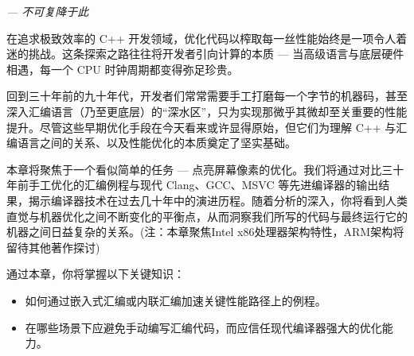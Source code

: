 \begin{flushright}
\textit{--- 不可复降于此}
\end{flushright}

在追求极致效率的 C++ 开发领域，优化代码以榨取每一丝性能始终是一项令人着迷的挑战。这条探索之路往往将开发者引向计算的本质 --- 当高级语言与底层硬件相遇，每一个 CPU 时钟周期都变得弥足珍贵。

回到三十年前的九十年代，开发者们常常需要手工打磨每一个字节的机器码，甚至深入汇编语言（乃至更底层）的“深水区”，只为实现那微乎其微却至关重要的性能提升。尽管这些早期优化手段在今天看来或许显得原始，但它们为理解 C++ 与汇编语言之间的关系、以及性能优化的本质奠定了坚实基础。

本章将聚焦于一个看似简单的任务 --- 点亮屏幕像素的优化。我们将通过对比三十年前手工优化的汇编例程与现代 Clang、GCC、MSVC 等先进编译器的输出结果，揭示编译器技术在过去几十年中的演进历程。随着分析的深入，你将看到人类直觉与机器优化之间不断变化的平衡点，从而洞察我们所写的代码与最终运行它的机器之间日益复杂的关系。(注：本章聚焦Intel x86处理器架构特性，ARM架构将留待其他著作探讨)

通过本章，你将掌握以下关键知识：

\begin{itemize}
\item 
如何通过嵌入式汇编或内联汇编加速关键性能路径上的例程。

\item 
在哪些场景下应避免手动编写汇编代码，而应信任现代编译器强大的优化能力。
\end{itemize}


